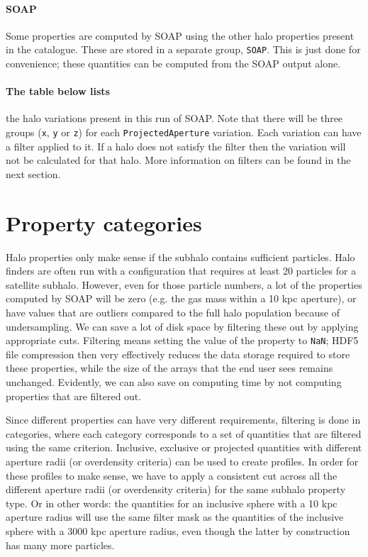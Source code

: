 \documentclass{article}
\begin{document}
\paragraph{SOAP} Some properties are computed by SOAP using the other halo properties
present in the catalogue.
These are stored in a separate group, \verb+SOAP+. This is just done for convenience; these quantities can be computed from the SOAP output alone.

\paragraph{The table below lists} the halo variations present in this run of SOAP.
Note that there will be three groups (\verb+x+, \verb+y+ or \verb+z+) for each \verb+ProjectedAperture+ variation.
Each variation can have a filter applied to it. If a halo does not satisfy the filter then the variation will
not be calculated for that halo. More information on filters can be found in the next section.



\section{Property categories}

Halo properties only make sense if the subhalo contains sufficient particles. Halo finders are often run with a 
configuration that requires at least 20 particles for a satellite subhalo.  
However, even for those particle numbers, a lot of the properties computed by SOAP will be zero (e.g. 
the gas mass within a 10 kpc aperture), or have values that are outliers compared to the full halo population 
because of undersampling. We can save a lot of disk space by filtering these out by applying appropriate cuts. 
Filtering means setting the value of the property to \verb+NaN+; HDF5 file compression then very effectively 
reduces the data storage required to store these properties, while the size of the arrays that the end user 
sees remains unchanged. Evidently, we can also save on computing time by not computing properties that are 
filtered out.

Since different properties can have very different requirements, filtering is done in categories, where each 
category corresponds to a set of quantities that are filtered using the same criterion. Inclusive, exclusive 
or projected quantities with different aperture radii (or overdensity criteria) can be used to create 
profiles. In order for these profiles to make sense, we have to apply a consistent cut across all the 
different aperture radii (or overdensity criteria) for the same subhalo property type. Or in other words: the 
quantities for an inclusive sphere with a 10 kpc aperture radius will use the same filter mask as the 
quantities of the inclusive sphere with a 3000 kpc aperture radius, even though the latter by construction has 
many more particles.
\end{document}
